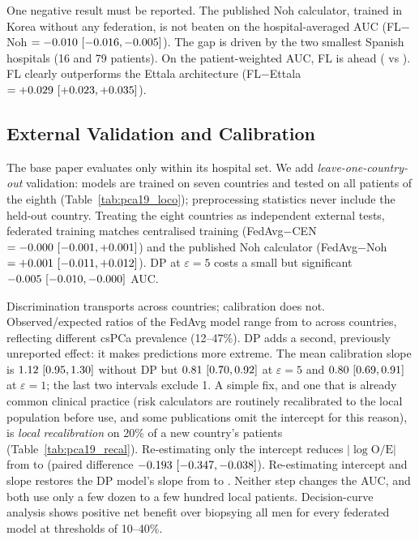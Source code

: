One negative result must be reported. The published Noh calculator, trained in Korea without any federation, is not beaten on the hospital-averaged AUC (FL$-$Noh $=-0.010\ [-0.016, -0.005]$). The gap is driven by the two smallest Spanish hospitals (16 and 79 patients). On the patient-weighted AUC, FL is ahead (\pWFL{} vs \pWNoh{}). FL clearly outperforms the Ettala architecture (FL$-$Ettala $=+0.029\ [+0.023, +0.035]$).



\subsection{External Validation and Calibration}
\label{sec:p19_loco}
The base paper evaluates only within its hospital set. We add \emph{leave-one-country-out} validation: models are trained on seven countries and tested on all patients of the eighth (Table~\ref{tab:pca19_loco}); preprocessing statistics never include the held-out country. Treating the eight countries as independent external tests, federated training matches centralised training (FedAvg$-$CEN $=-0.000\ [-0.001, +0.001]$) and the published Noh calculator (FedAvg$-$Noh $=+0.001\ [-0.011, +0.012]$). DP at $\varepsilon=5$ costs a small but significant $-0.005\ [-0.010, -0.000]$ AUC.

Discrimination transports across countries; calibration does not. Observed/expected ratios of the FedAvg model range from \pOeMin{} to \pOeMax{} across countries, reflecting different csPCa prevalence (12--47\%). DP adds a second, previously unreported effect: it makes predictions more extreme. The mean calibration slope is $1.12\ [0.95, 1.30]$ without DP but $0.81\ [0.70, 0.92]$ at $\varepsilon=5$ and $0.80\ [0.69, 0.91]$ at $\varepsilon=1$; the last two intervals exclude 1. A simple fix, and one that is already common clinical practice (risk calculators are routinely recalibrated to the local population before use, and some publications omit the intercept for this reason), is \emph{local recalibration} on 20\% of a new country's patients (Table~\ref{tab:pca19_recal}). Re-estimating only the intercept reduces $|\log \mathrm{O/E}|$ from \pRecalOeRaw{} to \pRecalOeInt{} (paired difference $-0.193\ [-0.347, -0.038]$). Re-estimating intercept and slope restores the DP model's slope from \pRecalSlopeDpRaw{} to \pRecalSlopeDpLog{}. Neither step changes the AUC, and both use only a few dozen to a few hundred local patients. Decision-curve analysis shows positive net benefit over biopsying all men for every federated model at thresholds of 10--40\%.









